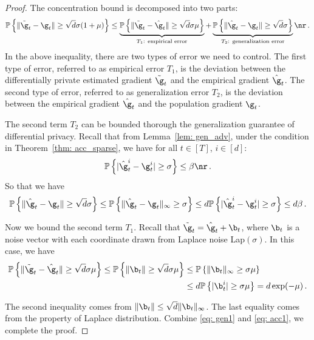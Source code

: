 \begin{proof}
The concentration bound is decomposed into two parts:
\begin{equation}
    \begin{split}
\mathbb{P}  \left\{ \|\tilde \g_t - \g_t\| \geq \sqrt{d}\sigma(1+\mu)\right\} \leq
    \underbrace{ \mathbb{P}\left\{ \|\tilde \g_t - \hat \g_t\| \geq  \sqrt{d}\sigma \mu\right\} }_{\text{$T_1$: empirical error}} 
     + \underbrace{\mathbb{P}\left\{ \|\hat \g_t - \g_t\| \geq \sqrt{d}\sigma \right\}}_{\text{$T_2$: generalization error}} \nr \, .
    \end{split}
\end{equation}
In the above inequality, there are two types of error we need to control. The first type of error, referred to as empirical error $T_1$, is the deviation between the differentially
private estimated gradient $\tilde \g_t$ and the empirical gradient $\hat \g_t$. The second type of error, referred to as generalization error $T_2$, is the deviation
between the empirical gradient $\hat \g_t$ and the population gradient $\g_t$. 

The second term $T_2$ can be bounded thorough the generalization guarantee of differential privacy. Recall that from  Lemma~\ref{lem: gen_adv}, under the condition in Theorem~\ref{thm: acc_sparse}, we have for all $t \in [T]$, $i \in [d]$: 
\begin{equation}
    \mathbb{P}\left\{ |\hat \g_t^i - \g_t^i| \geq  \sigma \right\} \leq \beta \nr \, .
\end{equation}
So that we have 
\begin{equation}\label{eq: gen1}
\mathbb{P}\left\{ \|\hat \g_t - \g_t\| \geq  \sqrt{d}\sigma \right\} \leq \mathbb{P}\left\{ \|\hat \g_t - \g_t\|_\infty \geq  \sigma  \right\} \leq d \mathbb{P}\left\{ |\hat \g_t^i - \g_t^i| \geq  \sigma \right\} \leq d\beta \, .
\end{equation}

Now we bound the second term $T_1$. Recall that $\tilde \g_t = \hat \g_t + \b_t$, where $\b_t$ is a noise vector with each coordinate drawn from Laplace noise Lap$(\sigma)$. In this case, we have
\begin{align} \label{eq: acc1}
\mathbb{P}\left\{ \|\tilde \g_t - \hat \g_t\| \geq  \sqrt{d}\sigma \mu \right\}  \leq \mathbb{P} \left\{ \|\b_t\| \geq  \sqrt{d}\sigma \mu \right\}  &\leq \mathbb{P} \left\{ \|\b_t\|_\infty \geq  \sigma \mu \right\} \\ 
  &\leq d \mathbb{P} \left\{ |\b_t^i| \geq \sigma \mu \right\} = d \exp(-\mu) \, .
\end{align}

The second inequality comes from $\|\b_t\| \leq \sqrt{d}\|\b_t\|_\infty$. The
last equality comes from the property of Laplace distribution. Combine \eqref{eq: gen1} and \eqref{eq: acc1}, we complete the proof.
\end{proof}


